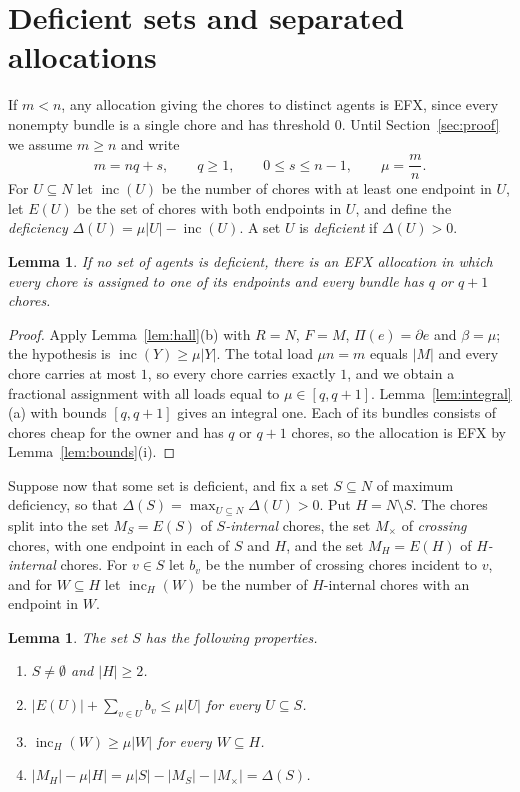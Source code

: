 \documentclass{amsart}
\numberwithin{equation}{section}
\newtheorem{lemma}[theorem]{Lemma}
\theoremstyle{definition}
\theoremstyle{remark}
\newcommand{\inc}{\operatorname{inc}}
\newcommand{\bd}{\partial}
\begin{document}
\section{Deficient sets and separated allocations}\label{sec:separated}

If $m<n$, any allocation giving the chores to distinct agents is EFX, since every nonempty bundle is a single chore and has threshold $0$. Until Section~\ref{sec:proof} we assume $m\ge n$ and write
\[
m=nq+s,\qquad q\ge 1,\qquad 0\le s\le n-1,\qquad \mu=\frac{m}{n}.
\]
For $U\subseteq N$ let $\inc(U)$ be the number of chores with at least one endpoint in $U$, let $E(U)$ be the set of chores with both endpoints in $U$, and define the \emph{deficiency} $\Delta(U)=\mu|U|-\inc(U)$. A set $U$ is \emph{deficient} if $\Delta(U)>0$.

\begin{lemma}\label{lem:nodef}
If no set of agents is deficient, there is an EFX allocation in which every chore is assigned to one of its endpoints and every bundle has $q$ or $q+1$ chores.
\end{lemma}

\begin{proof}
Apply Lemma~\ref{lem:hall}(b) with $R=N$, $F=M$, $\Pi(e)=\bd e$ and $\beta=\mu$; the hypothesis is $\inc(Y)\ge\mu|Y|$. The total load $\mu n=m$ equals $|M|$ and every chore carries at most $1$, so every chore carries exactly $1$, and we obtain a fractional assignment with all loads equal to $\mu\in[q,q+1]$. Lemma~\ref{lem:integral}(a) with bounds $[q,q+1]$ gives an integral one. Each of its bundles consists of chores cheap for the owner and has $q$ or $q+1$ chores, so the allocation is EFX by Lemma~\ref{lem:bounds}(i).
\end{proof}

Suppose now that some set is deficient, and fix a set $S\subseteq N$ of maximum deficiency, so that $\Delta(S)=\max_{U\subseteq N}\Delta(U)>0$. Put $H=N\setminus S$. The chores split into the set $M_S=E(S)$ of \emph{$S$-internal} chores, the set $M_\times$ of \emph{crossing} chores, with one endpoint in each of $S$ and $H$, and the set $M_H=E(H)$ of \emph{$H$-internal} chores. For $v\in S$ let $b_v$ be the number of crossing chores incident to $v$, and for $W\subseteq H$ let $\inc_H(W)$ be the number of $H$-internal chores with an endpoint in $W$.

\begin{lemma}\label{lem:maxdef}
The set $S$ has the following properties.
\begin{enumerate}[label=\textup{(\alph*)}]
\item $S\ne\emptyset$ and $|H|\ge 2$.
\item $|E(U)|+\sum_{v\in U}b_v\le\mu|U|$ for every $U\subseteq S$.
\item $\inc_H(W)\ge\mu|W|$ for every $W\subseteq H$.
\item $|M_H|-\mu|H|=\mu|S|-|M_S|-|M_\times|=\Delta(S)$.
\end{enumerate}
\end{lemma}
\end{document}
